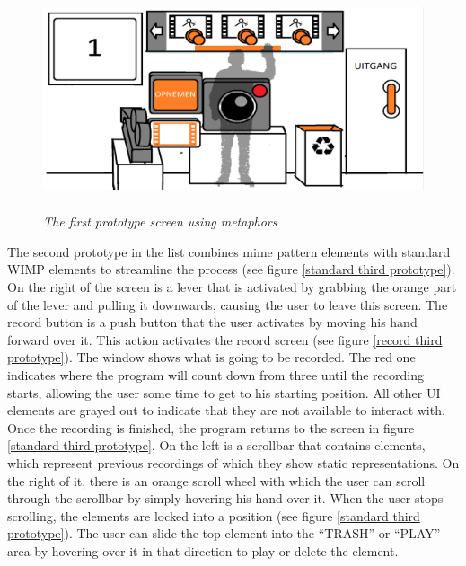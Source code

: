 \begin{figure}[H]
	\begin{center}
		\includegraphics[width=11.5cm, height=6.5cm]{figures/prototype_1_1_standard.png}
		\caption{\emph{The first prototype screen using metaphors}}
		\label{first prototype}
	\end{center}
\end{figure}

The second prototype in the list combines mime pattern elements with standard WIMP elements to streamline the process (see figure \ref{standard third prototype}). On the right of the screen is a lever that is activated by grabbing the orange part of the lever and pulling it downwards, causing the user to leave this screen. The record button is a push button that the user activates by moving his hand forward over it. This action activates the record screen (see figure \ref{record third prototype}). The window shows what is going to be recorded. The red one indicates where the program will count down from three until the recording starts, allowing the user some time to get to his starting position. All other UI elements are grayed out to indicate that they are not available to interact with. Once the recording is finished, the program returns to the screen in figure \ref{standard third prototype}. On the left is a scrollbar that contains elements, which represent previous recordings of which they show static representations. On the right of it, there is an orange scroll wheel with which the user can scroll through the scrollbar by simply hovering his hand over it. When the user stops scrolling, the elements are locked into a position (see figure \ref{standard third prototype}). The user can slide the top element into the ``TRASH'' or ``PLAY'' area by hovering over it in that direction to play or delete the element.\\

